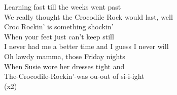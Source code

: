 Learning fast till the weeks went past\\
We really thought the Crocodile Rock would last, well\\
 Croc Rockin' is something shockin'\\
When your feet just can't keep still\\
 I never had me a better time and I guess I never will\\
Oh lawdy mamma, those Friday nights\\
When Susie wore her dresses tight and\\
 The-Crocodile-Rockin'-was ou-out of si-i-ight\\
        (x2)
